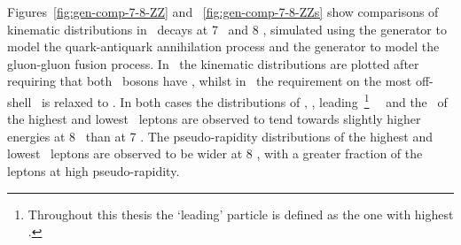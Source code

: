 Figures~\ref{fig:gen-comp-7-8-ZZ} and ~\ref{fig:gen-comp-7-8-ZZs} show comparisons of kinematic distributions in \ZZllll\
decays at 7 \tev\ and 8 \tev, simulated using the \powhegbox\cite{Melia:2011tj} generator
to model the quark-antiquark annihilation process and the \ggtwoZZ\cite{gg2ZZ} generator to
model the gluon-gluon fusion process. 
In~ the kinematic
distributions are plotted after requiring that both \Z\ bosons have \sstooos,
whilst in~\fig{gen-comp-7-8-ZZs} the requirement on the most off-shell \Z\ is
relaxed to \mZgtt. In both cases the distributions of \mZZ, \ptZZ,
leading~\footnote{Throughout this thesis the `leading' particle is defined as
the one with highest \pt.}  \Z\ 
\pt\ and the \pt\ of the highest and lowest \pt\ leptons are observed to tend towards
slightly higher energies at 8 \tev\ than at 7 \tev. The pseudo-rapidity
distributions of the highest and lowest \pt\ leptons are observed to be wider at
8 \tev, with a greater fraction of the leptons at high pseudo-rapidity.

